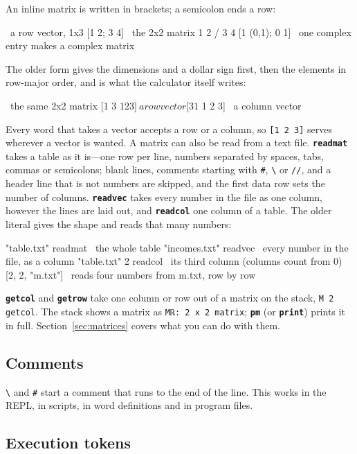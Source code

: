 \documentclass[11pt,letterpaper]{article}
\newcommand{\code}[1]{\texttt{#1}}
\newcommand{\g}[1]{{\mathglyphs #1}}   %
\newcommand{\cmd}[1]{\texttt{\textbf{#1}}}
\begin{document}
An inline matrix is written in brackets; a semicolon ends a row:
\begin{rpn}
[1 2 3]                     \ a row vector, 1x3
[1 2; 3 4]                  \ the 2x2 matrix  1 2 / 3 4
[1 (0,1); 0 1]              \ one complex entry makes a complex matrix
\end{rpn}
The older form gives the dimensions and a dollar sign first, then the elements in row-major order, and is what the calculator itself writes:
\begin{rpn}
[2 2 $ 1 2 3 4]             \ the same 2x2 matrix
[1 3 $ 1 2 3]               \ a row vector
[3 1 $ 1 2 3]               \ a column vector
\end{rpn}
Every word that takes a vector accepts a row or a column, so \code{[1 2 3]} serves wherever a vector is wanted.
A matrix can also be read from a text file. \cmd{readmat} takes a table as it is---one row per line, numbers separated by spaces, tabs, commas or semicolons; blank lines, comments starting with \code{\#}, \code{\textbackslash} or \code{//}, and a header line that is not numbers are skipped, and the first data row sets the number of columns. \cmd{readvec} takes every number in the file as one column, however the lines are laid out, and \cmd{readcol} one column of a table. The older literal gives the shape and reads that many numbers:
\begin{rpn}
"table.txt" readmat          \ the whole table
"incomes.txt" readvec        \ every number in the file, as a column
"table.txt" 2 readcol        \ its third column (columns count from 0)
[2, 2, "m.txt"]              \ reads four numbers from m.txt, row by row
\end{rpn}
\cmd{getcol} and \cmd{getrow} take one column or row out of a matrix on the stack, \code{M 2 getcol}.
The stack shows a matrix as \code{M\g{ℝ}: 2 x 2 matrix}; \cmd{pm} (or \cmd{print}) prints it in full. Section~\ref{sec:matrices} covers what you can do with them.

\subsection{Comments}

\code{\textbackslash} and \code{\#} start a comment that runs to the end of the line. This works in the REPL, in scripts, in word definitions and in program files.

\subsection{Execution tokens}
\end{document}
